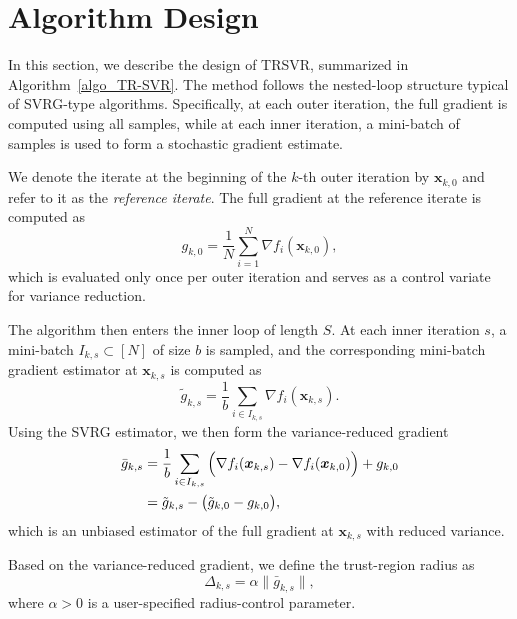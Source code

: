 \documentclass{article}
\newcommand{\bx}{\boldsymbol{x}}
\newcommand{\barg}{\bar{g}}
\theoremstyle{plain}
\theoremstyle{definition}
\theoremstyle{remark}
\begin{document}
\section{Algorithm Design}\label{algo_design}

In this section, we describe the design of TRSVR, summarized in Algorithm~\ref{algo_TR-SVR}. The method follows the nested-loop structure typical of SVRG-type algorithms. Specifically, at each outer iteration, the full gradient is computed using all samples, while at each inner iteration, a mini-batch of samples is used to form a stochastic gradient estimate.

We denote the iterate at the beginning of the $k$-th outer iteration by $\bx_{k,0}$ and refer to it as the \emph{reference iterate}. The full gradient at the reference iterate is computed as
\vspace{-0.15cm}
\begin{equation}\label{full_gradient}
    g_{k,0} = \frac{1}{N} \sum_{i=1}^{N} \nabla f_i(\bx_{k,0}),
\end{equation}
which is evaluated only once per outer iteration and serves as a control variate for variance reduction.



The algorithm then enters the inner loop of length $S$. At each inner iteration $s$, a mini-batch $I_{k,s} \subset [N]$ of size $b$ is sampled, and the corresponding mini-batch gradient estimator at $\bx_{k,s}$ is computed as
\vspace{-0.1cm}
\begin{equation}\label{mini_batch_gradient}
    \tilde{g}_{k,s} = \frac{1}{b} \sum_{i \in I_{k,s}} \nabla f_i(\bx_{k,s}).
\end{equation}
Using the SVRG estimator, we then form the variance-reduced gradient
\begin{align}\label{var_reduced_grad}
\barg_{k,s}
&= \frac{1}{b} \sum_{i \in I_{k,s}} \Big( \nabla f_i(\bx_{k,s}) - \nabla f_i(\bx_{k,0}) \Big) + g_{k,0} \notag \\
&= \tilde{g}_{k,s} - \big( \tilde{g}_{k,0} - g_{k,0} \big),
\end{align}
which is an unbiased estimator of the full gradient at $\bx_{k,s}$ with reduced variance.

Based on the variance-reduced gradient, we define the trust-region radius as
\begin{equation}\label{trust-region radius}
    \Delta_{k,s} = \alpha \|\barg_{k,s}\|,
\end{equation}
where $\alpha > 0$ is a user-specified radius-control parameter. 
\end{document}

